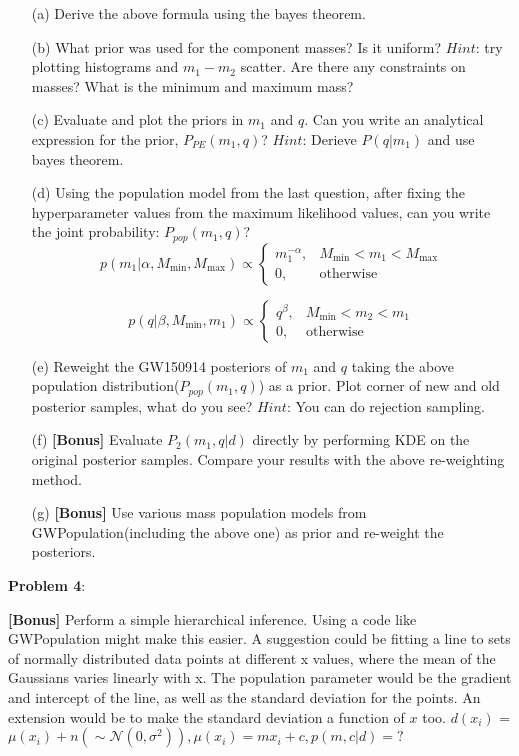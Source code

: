 \documentclass{article} %
\newcommand{\question}[2][]{\begin{flushleft}
        \textbf{Problem #1}: %
\end{flushleft}
}
\begin{document}
\begin{enumerate}
 	\item[(a)] Derive the above formula using the bayes theorem. 
	\item[(b)] What prior was used for the component masses? Is it uniform? $Hint$: try plotting histograms and $m_1-m_2$ scatter. Are there any constraints on masses? What is the minimum and maximum mass? 
	\item[(c)] Evaluate and plot the priors in $m_1$ and $q$. Can you write an analytical expression for the prior, $P_{PE}(m_1,q)$? $Hint$: Derieve $P(q|m_1)$ and use bayes theorem.
	\item[(d)] Using the population model from the last question, after fixing the hyperparameter values from the maximum likelihood values, can you write the joint probability: $P_{pop}(m_1,q)$? \\ 
\begin{equation}
  p(m_1|\alpha, M_\mathrm{min}, M_\mathrm{max}) \propto \begin{cases} m_1 ^ {-\alpha}, & M_\mathrm{min} < m_1 < M_\mathrm{max} \\ 0, & \mathrm{otherwise}\end{cases}  
\end{equation}

\begin{equation}
    p(q|\beta, M_\mathrm{min}, m_1) \propto \begin{cases}
q ^ {\beta},  & M_\mathrm{min} < m_2 < m_1 \\ 
0, & \mathrm{otherwise}
\end{cases}
\end{equation}


\item[(e)]Reweight the GW150914 posteriors of $m_1$ and $q$ taking the above population distribution($P_{pop}(m_1,q)$) as a prior. Plot corner of new and old posterior samples, what do you see? $Hint$: You can do rejection sampling.

\item[(f)]\textbf{[Bonus]} Evaluate $P_2(m_1,q|d)$ directly by performing KDE on the original posterior samples. Compare your results with the above re-weighting method.

\item[(g)]\textbf{[Bonus]} Use various mass population models from GWPopulation(including the above one) as prior and re-weight the posteriors.

        
    \end{enumerate}
    
    \question[4]{} \textbf{[Bonus]}
    Perform a simple hierarchical inference. Using a code like GWPopulation might make this easier. A suggestion could be fitting a line to sets of normally distributed data points at different x values, where the mean of the Gaussians varies linearly with x. The population parameter would be the gradient and intercept of the line, as well as the standard deviation for the points. An extension would be to make the standard deviation a function of $x$ too. $d(x_i)$ = $\mu(x_i) + n( \sim \mathcal{N}(0, \sigma^2)) , \mu(x_i) = m x_i + c,   p(m,c|d)=?$
\end{document}
